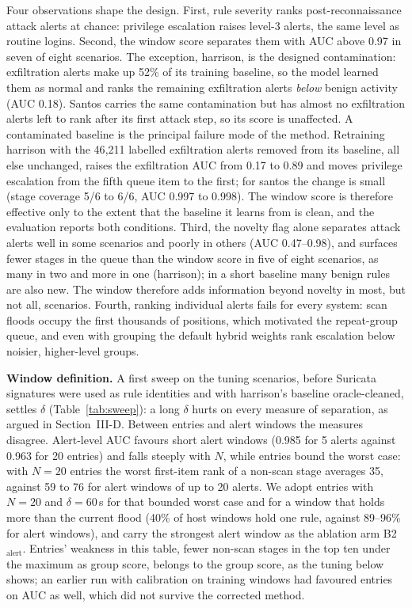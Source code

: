 \documentclass[conference]{IEEEtran}
\begin{document}
Four observations shape the design. First, rule severity ranks post-reconnaissance attack alerts at chance: privilege escalation raises level-3 alerts, the same level as routine logins. Second, the window score separates them with AUC above 0.97 in seven of eight scenarios. The exception, harrison, is the designed contamination: exfiltration alerts make up 52\% of its training baseline, so the model learned them as normal and ranks the remaining exfiltration alerts \emph{below} benign activity (AUC 0.18). Santos carries the same contamination but has almost no exfiltration alerts left to rank after its first attack step, so its score is unaffected. A contaminated baseline is the principal failure mode of the method. Retraining harrison with the 46{,}211 labelled exfiltration alerts removed from its baseline, all else unchanged, raises the exfiltration AUC from 0.17 to 0.89 and moves privilege escalation from the fifth queue item to the first; for santos the change is small (stage coverage 5/6 to 6/6, AUC 0.997 to 0.998). The window score is therefore effective only to the extent that the baseline it learns from is clean, and the evaluation reports both conditions. Third, the novelty flag alone separates attack alerts well in some scenarios and poorly in others (AUC 0.47--0.98), and surfaces fewer stages in the queue than the window score in five of eight scenarios, as many in two and more in one (harrison); in a short baseline many benign rules are also new. The window therefore adds information beyond novelty in most, but not all, scenarios. Fourth, ranking individual alerts fails for every system: scan floods occupy the first thousands of positions, which motivated the repeat-group queue, and even with grouping the default hybrid weights rank escalation below noisier, higher-level groups.


\textbf{Window definition.} A first sweep on the tuning scenarios, before Suricata signatures were used as rule identities and with harrison's baseline oracle-cleaned, settles $\delta$ (Table~\ref{tab:sweep}): a long $\delta$ hurts on every measure of separation, as argued in Section~III-D. Between entries and alert windows the measures disagree. Alert-level AUC favours short alert windows (0.985 for 5 alerts against 0.963 for 20 entries) and falls steeply with $N$, while entries bound the worst case: with $N = 20$ entries the worst first-item rank of a non-scan stage averages 35, against 59 to 76 for alert windows of up to 20 alerts. We adopt entries with $N = 20$ and $\delta = 60$\,s for that bounded worst case and for a window that holds more than the current flood (40\% of host windows hold one rule, against 89--96\% for alert windows), and carry the strongest alert window as the ablation arm B2$_\mathrm{alert}$. Entries' weakness in this table, fewer non-scan stages in the top ten under the maximum as group score, belongs to the group score, as the tuning below shows; an earlier run with calibration on training windows had favoured entries on AUC as well, which did not survive the corrected method.
\end{document}
